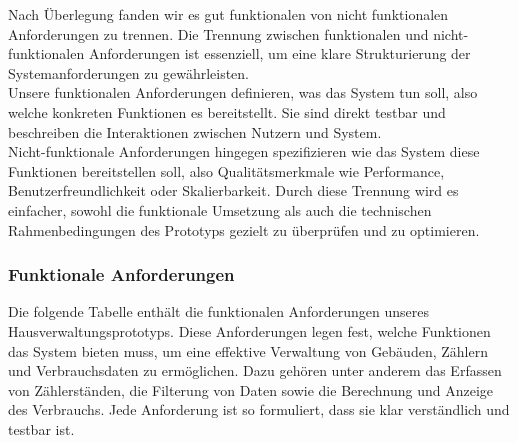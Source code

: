 Nach Überlegung fanden wir es gut funktionalen von nicht funktionalen Anforderungen zu trennen.
Die Trennung zwischen funktionalen und nicht-funktionalen Anforderungen ist essenziell, um eine klare Strukturierung der Systemanforderungen zu gewährleisten.\\
Unsere funktionalen Anforderungen definieren, was das System tun soll, also welche konkreten Funktionen es bereitstellt.
Sie sind direkt testbar und beschreiben die Interaktionen zwischen Nutzern und System.\\
Nicht-funktionale Anforderungen hingegen spezifizieren wie das System diese Funktionen bereitstellen soll, also Qualitätsmerkmale wie Performance, Benutzerfreundlichkeit oder Skalierbarkeit.
Durch diese Trennung wird es einfacher, sowohl die funktionale Umsetzung als auch die technischen Rahmenbedingungen des Prototyps gezielt zu überprüfen und zu optimieren.

\subsubsection{Funktionale Anforderungen}

Die folgende Tabelle enthält die funktionalen Anforderungen unseres Hausverwaltungsprototyps.
Diese Anforderungen legen fest, welche Funktionen das System bieten muss, um eine effektive Verwaltung von Gebäuden, Zählern und Verbrauchsdaten zu ermöglichen.
Dazu gehören unter anderem das Erfassen von Zählerständen, die Filterung von Daten sowie die Berechnung und Anzeige des Verbrauchs.
Jede Anforderung ist so formuliert, dass sie klar verständlich und testbar ist.

